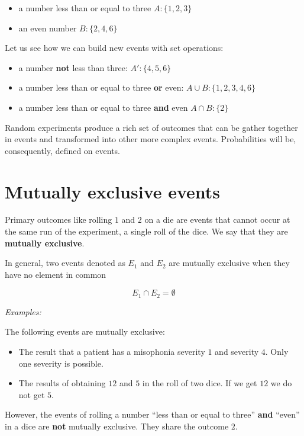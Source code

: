 \documentclass[
]{book}
\providecommand{\tightlist}{%
  \setlength{\itemsep}{0pt}\setlength{\parskip}{0pt}}
\begin{document}
\begin{itemize}
\tightlist
\item
  a number less than or equal to three \(A:\{ 1,2,3\}\)
\item
  an even number \(B:\{ 2,4,6\}\)
\end{itemize}

Let us see how we can build new events with set operations:

\begin{itemize}
\tightlist
\item
  a number \textbf{not} less than three: \(A':\{4,5,6\}\)
\item
  a number less than or equal to three \textbf{or} even: \(A \cup B: \{ 1,2,3,4,6\}\)
\item
  a number less than or equal to three \textbf{and} even \(A \cap B: \{ 2\}\)
\end{itemize}

Random experiments produce a rich set of outcomes that can be gather together in events and transformed into other more complex events. Probabilities will be, consequently, defined on events.

\hypertarget{mutually-exclusive-events}{%
\section{Mutually exclusive events}\label{mutually-exclusive-events}}

Primary outcomes like rolling \(1\) and \(2\) on a die are events that cannot occur at the same run of the experiment, a single roll of the dice. We say that they are \textbf{mutually exclusive}.

In general, two events denoted as \(E_1\) and \(E_2\) are mutually exclusive when they have no element in common

\[E_1\cap E_2=\emptyset\]

\emph{Examples:}

The following events are mutually exclusive:

\begin{itemize}
\item
  The result that a patient has a misophonia severity \(1\) and severity \(4\). Only one severity is possible.
\item
  The results of obtaining \(12\) and \(5\) in the roll of two dice. If we get \(12\) we do not get \(5\).
\end{itemize}

However, the events of rolling a number ``less than or equal to three'' \textbf{and} ``even'' in a dice are \textbf{not} mutually exclusive. They share the outcome \(2\).
\end{document}
